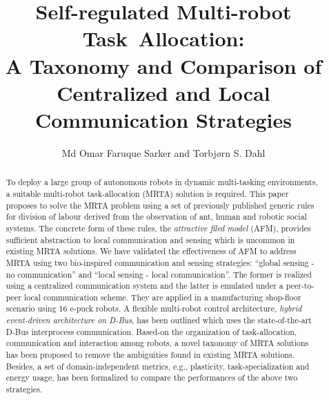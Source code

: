 \documentclass[final,5p,times,twocolumn]{elsarticle}
\begin{document}
\begin{frontmatter}
\title{Self-regulated Multi-robot Task~Allocation:\\ A Taxonomy and Comparison of Centralized and Local Communication Strategies}
\author[label1]{Md Omar Faruque Sarker and Torbj{\o}rn S. Dahl}
\address[label1]{Cognitive Robotics Research Centre\\
Newport Business School,
Allt-yr-yn Campus\\ %
Newport, NP20 5DA,
United Kingdom.\\
Mdomarfaruque.Sarker \vline Torbjorn.Dahl@newport.ac.uk}
%
%
%
\begin{abstract}
To deploy a large group of autonomous robots in dynamic multi-tasking environments, a suitable multi-robot task-allocation (MRTA) solution is required. This paper proposes to solve the MRTA problem using a set of previously published generic rules for division of labour derived from the observation of ant, human and robotic social systems. The concrete form of these rules, the \textit{attractive filed model} (AFM), provides sufficient abstraction to local communication and sensing which is uncommon in existing MRTA solutions. We have validated the effectiveness of AFM to address MRTA  using two bio-inspired communication and sensing strategies: ``global sensing - no communication'' and ``local sensing - local communication''. The former is realized using a centralized communication system and the latter is emulated under a peer-to-peer local communication scheme. They are applied in a  manufacturing shop-floor scenario using 16 e-puck robots. A flexible multi-robot control architecture, \textit{hybrid event-driven architecture on D-Bus}, has been outlined which uses the state-of-the-art D-Bus interprocess communication.  Based-on the organization of task-allocation, communication and interaction among robots, a  novel taxonomy of MRTA solutions has been proposed to remove the ambiguities found in existing MRTA solutions. Besides, a set of domain-independent metrics, e.g., plasticity, task-specialization and energy usage, has been formalized to compare the performances of the above two strategies.

\end{abstract}
\end{frontmatter}
\end{document}
